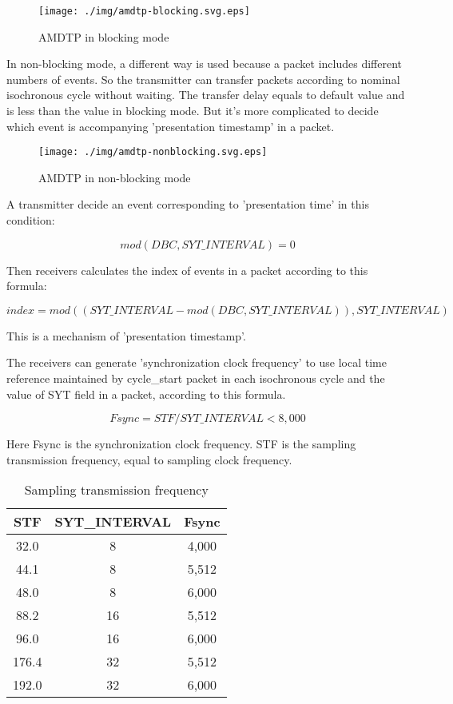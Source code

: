 \documentclass[onecolumn]{article}
\begin{document}
\begin{figure}[H]
	\centering
	\texttt{[image: ./img/amdtp-blocking.svg.eps]}
	\caption{{AMDTP in blocking mode}}
	\label{amdtp-blocking}
\end{figure}

In non-blocking mode, a different way is used because a packet includes different numbers of events. So the transmitter can transfer packets according to nominal isochronous cycle without waiting. The transfer delay equals to default value and is less than the value in blocking mode. But it's more complicated to decide which event is accompanying 'presentation timestamp' in a packet.

\begin{figure}[H]
	\centering
	\texttt{[image: ./img/amdtp-nonblocking.svg.eps]}
	\caption{{AMDTP in non-blocking mode}}
	\label{amdtp-nonblockingstart}
\end{figure}

A transmitter decide an event corresponding to 'presentation time' in this condition:

\begin{equation}
	mod(DBC, SYT\_INTERVAL) = 0
\end{equation}

Then receivers calculates the index of events in a packet according to this formula:

\begin{equation}
	index = mod((SYT\_INTERVAL - mod(DBC, SYT\_INTERVAL)), SYT\_INTERVAL)
\end{equation}

This is a mechanism of 'presentation timestamp'.

The receivers can generate 'synchronization clock frequency' to use local time reference maintained by cycle\_start packet in each isochronous cycle and the value of SYT field in a packet, according to this formula.

\begin{equation}
	Fsync = STF / SYT\_INTERVAL < 8,000
\end{equation}

Here Fsync is the synchronization clock frequency. STF is the sampling transmission frequency, equal to sampling clock frequency.

\begin{table}[H]
	\centering
	\caption{{Sampling transmission frequency}}
	\label{fsync}
	\begin{tabular}{ccc} \toprule
		STF & SYT\_INTERVAL & Fsync \\ \midrule
		32.0	& 8	& 4,000 \\
		44.1	& 8	& 5,512 \\
		48.0	& 8	& 6,000 \\
		88.2	& 16	& 5,512 \\
		96.0	& 16	& 6,000 \\
		176.4	& 32	& 5,512 \\
		192.0	& 32	& 6,000 \\ \bottomrule
	\end{tabular}
\end{table}
\end{document}
